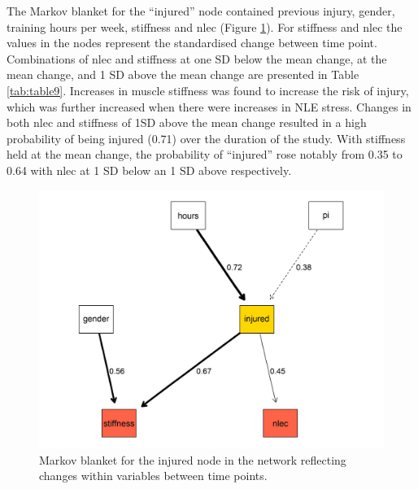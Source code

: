 \documentclass[
  english,
  man]{apa6}
\begin{document}
The Markov blanket for the ``injured'' node contained previous injury, gender, training hours per week, stiffness and nlec (Figure \ref{fig:fig5}).
For stiffness and nlec the values in the nodes represent the standardised change between time point.
Combinations of nlec and stiffness at one SD below the mean change, at the mean change, and 1 SD above the mean change are presented in Table \ref{tab:table9}.
Increases in muscle stiffness was found to increase the risk of injury, which was further increased when there were increases in NLE stress.
Changes in both nlec and stiffness of 1SD above the mean change resulted in a high probability of being injured (0.71) over the duration of the study.
With stiffness held at the mean change, the probability of ``injured'' rose notably from 0.35 to 0.64 with nlec at 1 SD below an 1 SD above respectively.

\begin{figure}

{\centering \includegraphics[width=1\linewidth]{figures_doc/Fig5} 

}

\caption{Markov blanket for the injured node in the network reflecting changes within variables between time points.}\label{fig:fig5}
\end{figure}
\end{document}
